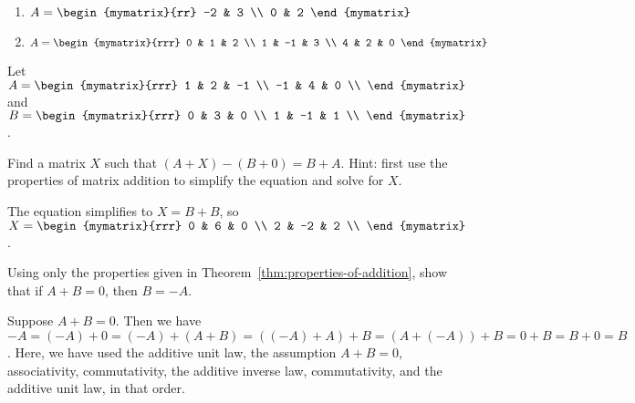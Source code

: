 \begin{enumialphparenastyle}
\begin{ex}
\begin{enumerate}
  \item
    $A = \begin{mymatrix}{rr}
      -2 & 3 \\
      0 & 2
    \end{mymatrix}$

  \item
    $A = \begin{mymatrix}{rrr}
      0 & 1 & 2 \\
      1 & -1 & 3 \\
      4 & 2 & 0
    \end{mymatrix}$
  \end{enumerate}
\end{ex}

\begin{ex}
  Let $A = \begin{mymatrix}{rrr}
    1 & 2 & -1 \\
    -1 & 4 & 0 \\
  \end{mymatrix}$ and
  $B = \begin{mymatrix}{rrr}
    0 & 3 & 0 \\
    1 & -1 & 1 \\
  \end{mymatrix}$.\par\noindent
  Find a matrix $X$ such that $(A+X)-(B+0) = B+A$. Hint: first use
  the properties of matrix addition to simplify the equation and
  solve for $X$.
  \begin{sol}
    The equation simplifies to $X=B+B$, so $X = \begin{mymatrix}{rrr}
    0 & 6 & 0 \\
    2 & -2 & 2 \\
    \end{mymatrix}$.
  \end{sol}
\end{ex}

\begin{ex}\label{add-inv-rst-unique}
  Using only the properties given in
  Theorem~\ref{thm:properties-of-addition}, show that if $A+B=0$, then
  $B=-A$.
  \begin{sol}
    Suppose $A+B=0$. Then we have
    $-A = (-A)+0 = (-A)+(A+B) = ((-A)+A)+B = (A+(-A))+B = 0+B = B+0 =
    B$.  Here, we have used the additive unit law, the assumption
    $A+B=0$, associativity, commutativity, the additive inverse law,
    commutativity, and the additive unit law, in that order.
  \end{sol}
\end{ex}


\end{enumialphparenastyle}
